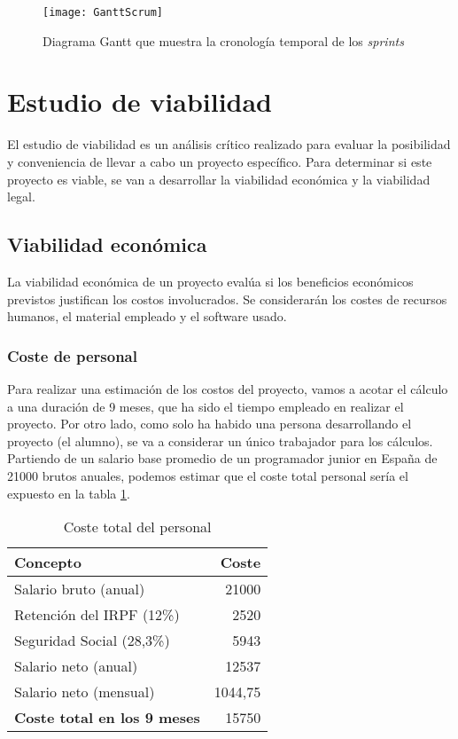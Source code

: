 \begin{landscape}
\begin{figure}[h]
	\caption[Diagrama Gantt sprints]{Diagrama Gantt que muestra la cronología temporal de los \textit{sprints}}
	\centering
	\texttt{[image: GanttScrum]}
	\label{fig:GanttScrum}
\end{figure}
\end{landscape}


\section{Estudio de viabilidad}

El estudio de viabilidad es un análisis crítico realizado para evaluar la posibilidad y conveniencia de llevar a cabo un proyecto específico.
Para determinar si este proyecto es viable, se van a desarrollar la viabilidad económica y la viabilidad legal.

\subsection{Viabilidad económica}

La viabilidad económica de un proyecto evalúa si los beneficios económicos previstos justifican los costos involucrados.
Se considerarán los costes de recursos humanos, el material empleado y el software usado.

\subsubsection{Coste de personal}

Para realizar una estimación de los costos del proyecto, vamos a acotar el cálculo a una duración de 9 meses, que ha sido el tiempo empleado en realizar el proyecto.
Por otro lado, como solo ha habido una persona desarrollando el proyecto (el alumno), se va a considerar un único trabajador para los cálculos.
Partiendo de un salario base promedio de un programador junior en España de 21000 brutos anuales, podemos estimar que el coste total personal sería el expuesto en la tabla \ref{tab:costoPersonal}.

\begin{table}[p]
	\centering
	\begin{tabular}{l r}
		\toprule
		\textbf{Concepto} &  \textbf{Coste} \\
		\midrule
		Salario bruto (anual) & 21000 \\
		Retención del IRPF (12\%) & 2520  \\
		Seguridad Social (28,3\%) & 5943 \\
		Salario neto (anual) & 12537 \\
		Salario neto (mensual) & 1044,75 \\
		\midrule
		\textbf{Coste total en los 9 meses} & 15750 \\
		\bottomrule
	\end{tabular}
	\caption{Coste total del personal}
	\label{tab:costoPersonal}
\end{table}




